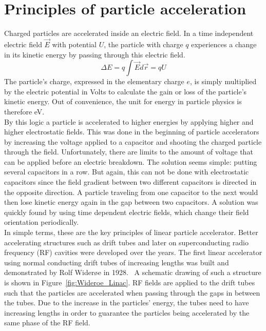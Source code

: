 \section{Principles of particle acceleration}
\label{AccPhysics:Principles}
Charged particles are accelerated inside an electric field. 
In a time independent electric field $\vec{E}$ with potential $U$, the particle with charge $q$ experiences a change in its kinetic energy by passing through this electric field.
\begin{equation}
 \Delta E = q \int \vec{E}d\vec{r} = qU
\end{equation}
The particle's charge, expressed in the elementary charge $e$, is simply multiplied by the electric potential in Volts to calculate the gain or loss of the particle's kinetic energy. 
Out of convenience, the unit for energy in particle physics is therefore eV.\\
By this logic a particle is accelerated to higher energies by applying higher and higher electrostatic fields. 
This was done in the beginning of particle accelerators by increasing the voltage applied to a capacitor and shooting the charged particle through the field. 
Unfortunately, there are limits to the amount of voltage that can be applied before an electric breakdown.
The solution seems simple: putting several capacitors in a row.
But again, this can not be done with electrostatic capacitors since the field gradient between two different capacitors is directed in the opposite direction.
A particle traveling from one capacitor to the next would then lose kinetic energy again in the gap between two capacitors.
A solution was quickly found by using time dependent electric fields, which change their field  orientation periodically.\\
In simple terms, these are the key principles of linear particle accelerator.
Better accelerating structures such as drift tubes and later on superconducting radio frequency (RF) cavities were developed over the years.
The first linear accelerator using normal conducting drift tubes of increasing lengths was built and demonstrated by Rolf Wider\o e in 1928.~\cite[p. 6]{Wilson}
A schematic drawing of such a structure is shown in Figure~\ref{fig:Wideroe_Linac}.
RF fields are applied to the drift tubes such that the particles are accelerated when passing through the gaps in between the tubes.
Due to the increase in the particles' energy, the tubes need to have increasing lengths in order to guarantee the particles being accelerated by the same phase of the RF field.
